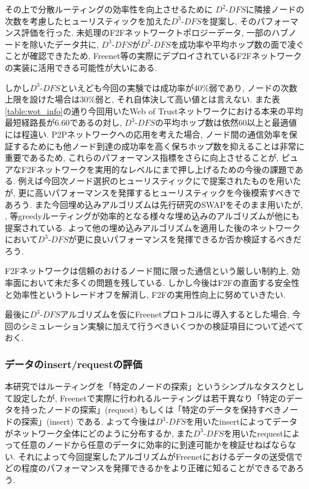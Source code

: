 \documentclass[dvipdfmx]{ampbt}
\begin{document}
その上で分散ルーティングの効率性を向上させるために $D^2$-$DFS$に隣接ノードの次数を考慮したヒューリスティックを加えた$D^3$-$DFS$を提案し, そのパフォーマンス評価を行った. 未処理のF2Fネットワークトポロジーデータ, 一部のハブノードを除いたデータ共に, $D^3$-$DFS$が$D^2$-$DFS$を成功率や平均ホップ数の面で凌ぐことが確認できたため, Freenet等の実際にデプロイされているF2Fネットワークの実装に活用できる可能性が大いにある. 

しかし$D^3$-$DFS$といえども今回の実験では成功率が40\%弱であり, ノードの次数上限を設けた場合は30\%弱と, それ自体決して高い値とは言えない. また表\ref{table:wot_info}の通り今回用いたWeb of Trustネットワークにおける本来の平均最短経路長が6.60であるの対し, $D^3$-$DFS$の平均ホップ数は依然60以上と最適値には程遠い. P2Pネットワークへの応用を考えた場合, ノード間の通信効率を保証するためにも他ノード到達の成功率を高く保ちホップ数を抑えることは非常に重要であるため, これらのパフォーマンス指標をさらに向上させることが, ピュアなF2Fネットワークを実用的なレベルにまで押し上げるための今後の課題である. 例えば今回次ノード選択のヒューリスティックに\cite{simsek2008navigating}で提案されたものを用いたが, 更に高いパフォーマンスを発揮するヒューリスティックを今後模索すべきであろう. また今回埋め込みアルゴリズムは先行研究のSWAPをそのまま用いたが, \cite{roos2017balanced}, \cite{boguna2010sustaining}等greedyルーティングが効率的となる様々な埋め込みのアルゴリズムが他にも提案されている. よって他の埋め込みアルゴリズムを適用した後のネットワークにおいて$D^3$-$DFS$が更に良いパフォーマンスを発揮できるか否か検証するべきだろう.

F2Fネットワークは信頼のおけるノード間に限った通信という厳しい制約上, 効率面において未だ多くの問題を残している. しかし今後はF2Fの直面する安全性と効率性というトレードオフを解消し, F2Fの実用性向上に努めていきたい. 

最後に$D^3$-$DFS$アルゴリズムを仮にFreenetプロトコルに導入するとした場合, 今回のシミュレーション実験に加えて行うべきいくつかの検証項目について述べておく.

\subsubsection*{データのinsert/requestの評価}
本研究ではルーティングを「特定のノードの探索」というシンプルなタスクとして設定したが, Freenetで実際に行われるルーティングは若干異なり「特定のデータを持ったノードの探索」(request) もしくは「特定のデータを保持すべきノードの探索」(insert) である. よって今後は$D^3$-$DFS$を用いたinsertによってデータがネットワーク全体にどのように分布するか, また$D^3$-$DFS$を用いたrequestによって任意のノードから任意のデータに効率的に到達可能かを検証せねばならない. それによって今回提案したアルゴリズムがFreenetにおけるデータの送受信でどの程度のパフォーマンスを発揮できるかをより正確に知ることができるであろう. 
\end{document}
